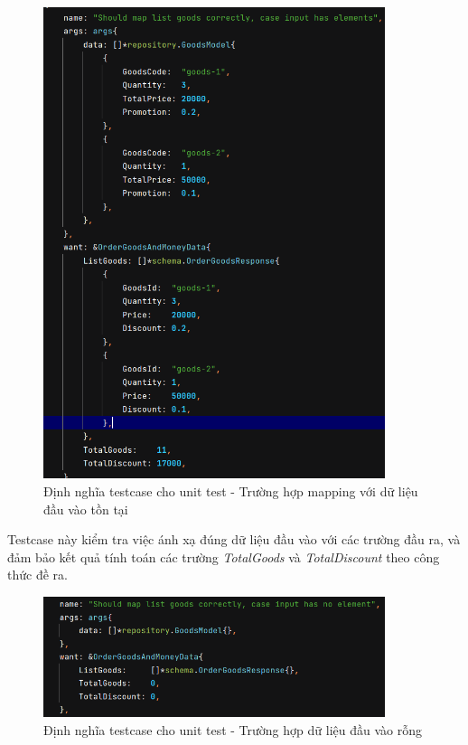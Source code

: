\begin{figure}[!htp]
    \begin{center}
        \includegraphics[width=10cm]{img/testing/unit_tc1.PNG}
    \end{center}
    \caption{Định nghĩa testcase cho unit test - Trường hợp mapping với dữ liệu đầu vào tồn tại}
\end{figure}

Testcase này kiểm tra việc ánh xạ đúng dữ liệu đầu vào với các trường đầu ra, và đảm bảo kết quả tính toán các trường \emph{TotalGoods} và \emph{TotalDiscount} theo công thức đề ra.\\
\newpage

\begin{figure}[!htp]
    \begin{center}
        \includegraphics[width=10cm]{img/testing/unit_tc2.PNG}
    \end{center}
    \caption{Định nghĩa testcase cho unit test - Trường hợp dữ liệu đầu vào rỗng}
\end{figure}

